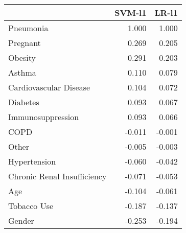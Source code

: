 \begin{tabular}{lrr}
\toprule
{} &  SVM-l1 &  LR-l1 \\
\midrule
Pneumonia                   &   1.000 &  1.000 \\
Pregnant                    &   0.269 &  0.205 \\
Obesity                     &   0.291 &  0.203 \\
Asthma                      &   0.110 &  0.079 \\
Cardiovascular Disease      &   0.104 &  0.072 \\
Diabetes                    &   0.093 &  0.067 \\
Immunosuppression           &   0.093 &  0.066 \\
COPD                        &  -0.011 & -0.001 \\
Other                       &  -0.005 & -0.003 \\
Hypertension                &  -0.060 & -0.042 \\
Chronic Renal Insufficiency &  -0.071 & -0.053 \\
Age                         &  -0.104 & -0.061 \\
Tobacco Use                 &  -0.187 & -0.137 \\
Gender                      &  -0.253 & -0.194 \\
\bottomrule
\end{tabular}
